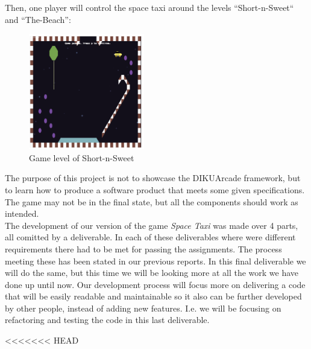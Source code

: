 \documentclass[../master.tex]{subfile}
\begin{document}
Then, one player will control the space taxi around the levels ``Short-n-Sweet`` and ``The-Beach'':
\begin{figure}[h]
	\centering
	\includegraphics[width=0.45\textwidth]{./Pictures/GameLevel.png}
    \caption{Game level of Short-n-Sweet}
\end{figure}

The purpose of this project is not to showcase the DIKUArcade framework, but to learn how to produce a software product that meets some given specifications. The game may not be in the final state, but all the components should work as intended.\\

The development of our version of the game \textit{Space Taxi} was made over 4 parts, all comitted by a deliverable. In each of these deliverables where were different requirements there had to be met for passing the assignments. The process meeting these has been stated in our previous reports. In this final deliverable we will do the same, but this time we will be looking more at all the work we have done up until now. Our development process will focus more on delivering a code that will be easily readable and maintainable so it also can be further developed by other people, instead of adding new features. I.e. we will be focusing on refactoring and testing the code in this last deliverable.

<<<<<<< HEAD
\end{document}
